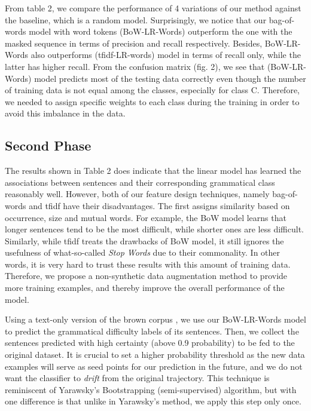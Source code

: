 From table 2, we compare the performance of 4 variations of our method against the baseline, which is a random model. Surprisingly, we notice that our bag-of-words model with word tokens (BoW-LR-Words) outperform the one with the masked sequence in terms of precision and recall respectively. Besides, BoW-LR-Words also outperforms (tfidf-LR-words) model in terms of recall only, while the latter has higher recall. From the confusion matrix (fig. 2), we see that (BoW-LR-Words) model predicts most of the testing data correctly even though the number of training data is not equal among the classes, especially for class C. Therefore, we needed to assign specific weights to each class during the training in order to avoid this imbalance in the data. 

\subsection{Second Phase}

The results shown in Table 2 does indicate that the linear model has learned the associations between sentences and their corresponding grammatical class reasonably well. However, both of our feature design techniques, namely bag-of-words and tfidf have their disadvantages. The first assigns similarity based on occurrence, size and mutual words. For example, the BoW model learns that longer sentences tend to be the most difficult, while shorter ones are less difficult. Similarly, while tfidf treats the drawbacks of BoW model, it still ignores the usefulness of what-so-called \textit{Stop Words} due to their commonality. In other words, it is very hard to trust these results with this amount of training data. Therefore, we propose a non-synthetic data augmentation method to provide more training examples, and thereby improve the overall performance of the model. 

Using a text-only version of the brown corpus \citep{citeulike: 13797746}, we use our BoW-LR-Words model to predict the grammatical difficulty labels of its sentences. Then, we collect the sentences predicted with high certainty (above 0.9 probability) to be fed to the original dataset. It is crucial to set a higher probability threshold as the new data examples will serve as seed points for our prediction in the future, and we do not want the classifier to \textit{drift} from the original trajectory. This technique is reminiscent of Yarawsky's Bootstrapping \citep{yarowsky_unsupervised_1995}(semi-supervised) algorithm, but with one difference is that unlike in Yarawsky's method, we apply this step only once. 

